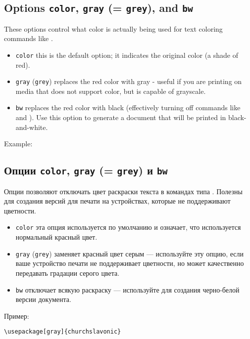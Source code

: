 \begin{EN}
\subsection{Options \texttt{color}, \texttt{gray} (= \texttt{grey}), and \texttt{bw}}
These options control what color is actually being used for text coloring commands like .

\begin{itemize}
\item \texttt{color} this is the default option; it indicates the original color (a shade of red).
\item \texttt{gray} (\texttt{grey}) replaces the red color with gray - useful if you are printing on media that
    does not support color, but is capable of grayscale.
\item \texttt{bw} replaces the red color with black (effectively turning off
commands like  and ). Use
    this option to generate a document that will be printed in black-and-white.
\end{itemize}
Example:
\end{EN}

\begin{RU}
\subsection{Опции \texttt{color}, \texttt{gray} (= \texttt{grey}) и \texttt{bw}}
Опции позволяют отключать цвет раскраски текста в командах типа .
Полезны для создания версий для печати на
устройствах, которые не поддерживают цветности.

\begin{itemize}
\item \texttt{color} эта опция используется по умолчанию и означает,
что используется нормальный красный цвет.
\item \texttt{gray} (\texttt{grey}) заменяет красный цвет серым --- используйте эту опцию, если
ваше устройство печати не поддерживает цветности, но может качественно передавать градации серого цвета.
\item \texttt{bw} отключает всякую раскраску --- используйте для создания черно-белой версии документа.
\end{itemize}
Пример:
\end{RU}

\begin{verbatim}
\usepackage[gray]{churchslavonic}
\end{verbatim}

